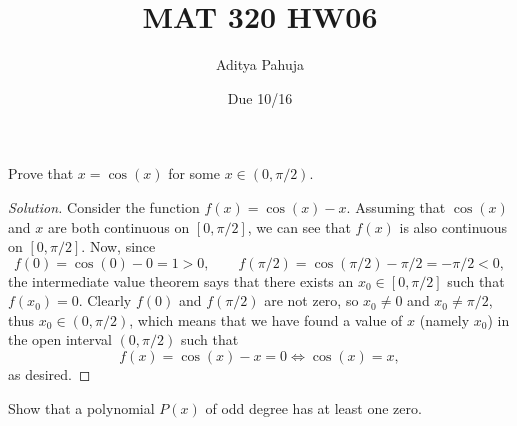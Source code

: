 \documentclass[11pt]{scrartcl}
\title{\vspace{-2em}MAT 320 HW06}
\author{\large Aditya Pahuja}
\date{\large Due 10/16}
\theoremstyle{problem}
\newenvironment{problem}[1]
{\renewcommand\theinnercustomthm{#1}\innercustomthm}
{\endinnercustomthm}
\theoremstyle{remark}
\newenvironment{soln}{\begin{proof}[Solution]}{\end{proof}}
\begin{document}
\maketitle

\begin{problem}{1}
	Prove that $x = \cos(x)$ for some $x\in(0, \pi/2)$.
\end{problem}

\begin{soln}
	Consider the function $f(x) = \cos(x) - x$. Assuming that $\cos(x)$
	and $x$ are both continuous on $[0, \pi/2]$, we can see that
	$f(x)$ is also continuous on $[0, \pi/2]$. Now, since
	\[f(0) = \cos(0) - 0 = 1 > 0,
	\qquad f(\pi/2) = \cos(\pi/2) - \pi/2 = -\pi/2 < 0,\]
	the intermediate value theorem says that there exists an
	$x_0\in[0, \pi/2]$ such that $f(x_0) = 0$.
	Clearly $f(0)$ and $f(\pi/2)$ are not zero,
	so $x_0 \ne 0$ and $x_0\ne\pi/2$, thus $x_0\in(0, \pi/2)$, which means that
	we have found a value of $x$ (namely $x_0$) in the open interval
	$(0, \pi/2)$ such that
	\[f(x) = \cos(x) - x = 0 \iff \cos(x) = x,\]
	as desired.
\end{soln}

\begin{problem}{2}
	Show that a polynomial $P(x)$ of odd degree
	has at least one zero.
\end{problem}
\end{document}
